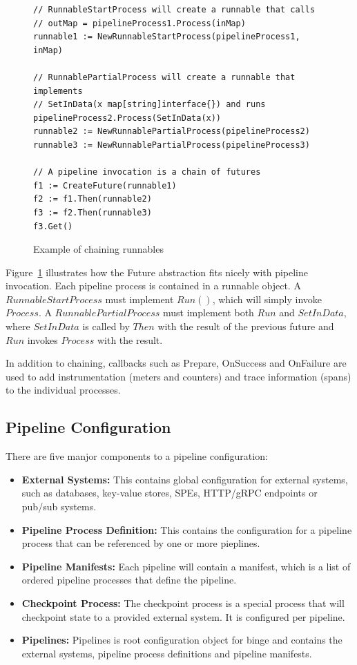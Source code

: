 \documentclass[10pt,twocolumn]{article}
\begin{document}
\begin{figure}
\begin{lstlisting}[linewidth=\columnwidth,breaklines=true]
// RunnableStartProcess will create a runnable that calls 
// outMap = pipelineProcess1.Process(inMap)
runnable1 := NewRunnableStartProcess(pipelineProcess1, inMap)

// RunnablePartialProcess will create a runnable that implements 
// SetInData(x map[string]interface{}) and runs pipelineProcess2.Process(SetInData(x))
runnable2 := NewRunnablePartialProcess(pipelineProcess2)
runnable3 := NewRunnablePartialProcess(pipelineProcess3)

// A pipeline invocation is a chain of futures
f1 := CreateFuture(runnable1)
f2 := f1.Then(runnable2)
f3 := f2.Then(runnable3)
f3.Get()
\end{lstlisting}
\caption{Example of chaining runnables}
\label{fig:runnables}
\end{figure}

Figure~\ref{fig:runnables} illustrates how the Future abstraction fits nicely
with pipeline invocation.  Each pipeline process is contained in a runnable
object.  A $RunnableStartProcess$ must implement $Run()$, which will simply
invoke $Process$.  A $RunnablePartialProcess$ must implement both $Run$ and
$SetInData$, where $SetInData$ is called by $Then$ with the result of the
previous future and $Run$ invokes $Process$ with the result.

In addition to chaining, callbacks such as Prepare, OnSuccess and OnFailure are
used to add instrumentation (meters and counters) and trace information (spans)
to the individual processes.

\subsection{Pipeline Configuration}

There are five manjor components to a pipeline configuration:

\begin{itemize}
\item{{\bfseries External Systems:}} This contains global configuration for external systems, such as databases, key-value stores, SPEs, HTTP/gRPC endpoints or pub/sub systems.
\item{{\bfseries Pipeline Process Definition:}} This contains the configuration for a pipeline process that can be referenced by one or more pieplines.
\item{{\bfseries Pipeline Manifests:}} Each pipeline will contain a manifest, which is a list of ordered pipeline processes that define the pipeline.
\item{{\bfseries Checkpoint Process:}} The checkpoint process is a special process that will checkpoint state to a provided external system.  It is configured per pipeline.
\item{{\bfseries Pipelines:}} Pipelines is root configuration object for binge and contains the external systems, pipeline process definitions and pipeline manifests.
\end{itemize}
\end{document}
